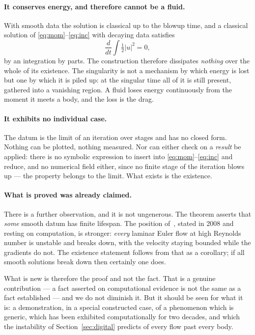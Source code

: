 \documentclass[11pt]{article}
\begin{document}
\paragraph{It conserves energy, and therefore cannot be a fluid.} With smooth data the solution is
classical up to the blowup time, and a classical solution of \eqref{eq:mom}--\eqref{eq:inc} with
decaying data satisfies
\[
\frac{d}{dt}\int \tfrac12 |u|^2 = 0 ,
\]
by an integration by parts. The construction therefore dissipates \emph{nothing} over the whole of
its existence. The singularity is not a mechanism by which energy is lost but one by which it is
piled up: at the singular time all of it is still present, gathered into a vanishing region. A fluid
loses energy continuously from the moment it meets a body, and the loss is the drag.

\paragraph{It exhibits no individual case.} The datum is the limit of an iteration over stages and
has no closed form. Nothing can be plotted, nothing measured. Nor can either check on a \emph{result}
be applied: there is no symbolic expression to insert into
\eqref{eq:mom}--\eqref{eq:inc} and reduce, and no numerical field either, since no finite stage of
the iteration blows up --- the property belongs to the limit. What exists is the existence.

\paragraph{What is proved was already claimed.} There is a further observation, and it is not
ungenerous. The theorem asserts that \emph{some} smooth datum has finite lifespan. The position
of~\cite{blowupHJ}, stated in 2008 and resting on computation, is stronger: \emph{every} laminar Euler
flow at high Reynolds number is unstable and breaks down, with the velocity staying bounded while the
gradients do not. The existence statement follows from that as a corollary; if all smooth solutions
break down then certainly one does.

What is new is therefore the proof and not the fact. That is a genuine contribution --- a fact
asserted on computational evidence is not the same as a fact established --- and we do not diminish
it. But it should be seen for what it is: a demonstration, in a special constructed case, of a
phenomenon which is generic, which has been exhibited computationally for two decades, and which the
instability of Section~\ref{sec:digital} predicts of every flow past every body.
\end{document}
